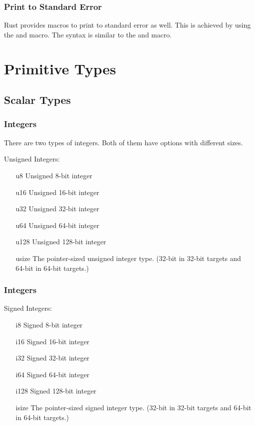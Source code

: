 \documentclass{beamer}
\begin{document}
\begin{frame}
  \frametitle{Print to Standard Error}
  Rust provides macros to print to standard error as well. This is achieved by using the  and  macro. The syntax is similar to the  and  macro.
  
\end{frame}

\section{Primitive Types}
\subsection{Scalar Types}
\begin{frame}
  \frametitle{Integers}
  There are two types of integers. Both of them have options with different sizes.

  Unsigned Integers:
  \begin{itemize}
    \item[u8]{Unsigned 8-bit integer}
    \item[u16]{Unsigned 16-bit integer}
    \item[u32]{Unsigned 32-bit integer}
    \item[u64]{Unsigned 64-bit integer}
    \item[u128]{Unsigned 128-bit integer}
    \item[usize]{The pointer-sized unsigned integer type. (32-bit in 32-bit targets and 64-bit in 64-bit targets.)}
  \end{itemize}
\end{frame}

\begin{frame}
  \frametitle{Integers}
  Signed Integers:
  \begin{itemize}
    \item[i8]{Signed 8-bit integer}
    \item[i16]{Signed 16-bit integer}
    \item[i32]{Signed 32-bit integer}
    \item[i64]{Signed 64-bit integer}
    \item[i128]{Signed 128-bit integer}
    \item[isize]{The pointer-sized signed integer type. (32-bit in 32-bit targets and 64-bit in 64-bit targets.)}
  \end{itemize}
\end{frame}
\end{document}
